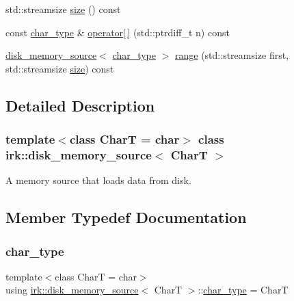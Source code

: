 \begin{DoxyCompactItemize}
\item 
std\+::streamsize \mbox{\hyperlink{classirk_1_1disk__memory__source_a6704788104e3593d275909ed0e558133}{size}} () const
\item 
const \mbox{\hyperlink{classirk_1_1disk__memory__source_a029ab1ba55fc543025c42ee3d7320dca}{char\+\_\+type}} \& \mbox{\hyperlink{classirk_1_1disk__memory__source_aa6d81c6ae0116c75a2ce31598b901471}{operator\mbox{[}$\,$\mbox{]}}} (std\+::ptrdiff\+\_\+t n) const
\item 
\mbox{\hyperlink{classirk_1_1disk__memory__source}{disk\+\_\+memory\+\_\+source}}$<$ \mbox{\hyperlink{classirk_1_1disk__memory__source_a029ab1ba55fc543025c42ee3d7320dca}{char\+\_\+type}} $>$ \mbox{\hyperlink{classirk_1_1disk__memory__source_a62bb8fd84d4e7ea1db50b0bd8c8aa355}{range}} (std\+::streamsize first, std\+::streamsize \mbox{\hyperlink{classirk_1_1disk__memory__source_a6704788104e3593d275909ed0e558133}{size}}) const
\end{DoxyCompactItemize}


\subsection{Detailed Description}
\subsubsection*{template$<$class CharT = char$>$\newline
class irk\+::disk\+\_\+memory\+\_\+source$<$ Char\+T $>$}

A memory source that loads data from disk. 

\subsection{Member Typedef Documentation}
\mbox{\label{classirk_1_1disk__memory__source_a029ab1ba55fc543025c42ee3d7320dca}} 
\subsubsection{\texorpdfstring{char\+\_\+type}{char\_type}}
{\footnotesize\ttfamily template$<$class CharT  = char$>$ \\
using \mbox{\hyperlink{classirk_1_1disk__memory__source}{irk\+::disk\+\_\+memory\+\_\+source}}$<$ CharT $>$\+::\mbox{\hyperlink{classirk_1_1disk__memory__source_a029ab1ba55fc543025c42ee3d7320dca}{char\+\_\+type}} =  CharT}

